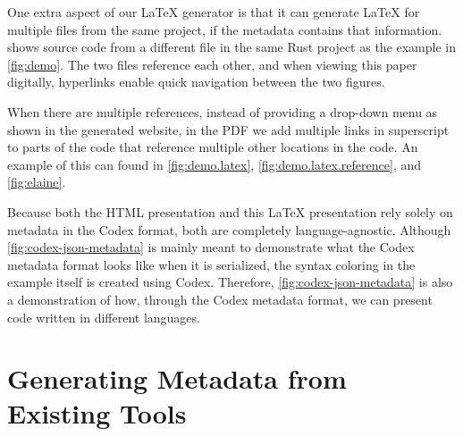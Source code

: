 
One extra aspect of our LaTeX generator is that it can generate LaTeX for multiple files from the same project, if the metadata contains that information.
 shows source code from a different file in the same Rust project as the example in \cref{fig:demo}.
The two files reference each other, and when viewing this paper digitally, hyperlinks enable quick navigation between the two figures.

When there are multiple references, instead of providing a drop-down menu as shown in the generated website, in the PDF we add multiple links in superscript to parts of the code that reference multiple other locations in the code.
An example of this can found in \cref{fig:demo.latex}, \cref{fig:demo.latex.reference}, and \cref{fig:elaine}.

Because both the HTML presentation and this LaTeX presentation rely solely on metadata in the Codex format,
both are completely language-agnostic.
Although \cref{fig:codex-json-metadata} is mainly meant to demonstrate what the Codex metadata format looks like when it is serialized, the syntax coloring in the example itself is created using Codex.
Therefore, \cref{fig:codex-json-metadata} is also a demonstration of how, through the Codex metadata format, we can present code written in different languages.



\section{Generating Metadata from Existing Tools}

